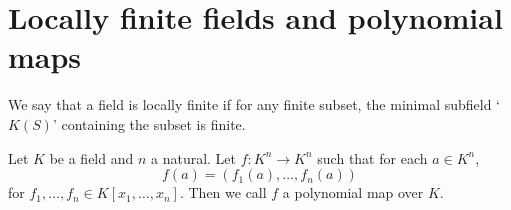 \section{Locally finite fields and polynomial maps}

\begin{dfn}
    We say that a field is locally finite if for any finite subset,
    the minimal subfield `$K(S)$' containing the subset is finite.
\end{dfn}

\begin{dfn}
    Let $K$ be a field and $n$ a natural.
    Let $f : K^n \to K^n$ such that for each $a \in K^n$,
    \[f(a) = (f_1(a), \dots, f_n(a))\] for 
    $f_1, \dots, f_n \in K[x_1, \dots, x_n]$.
    Then we call $f$ a polynomial map over $K$.
\end{dfn}

